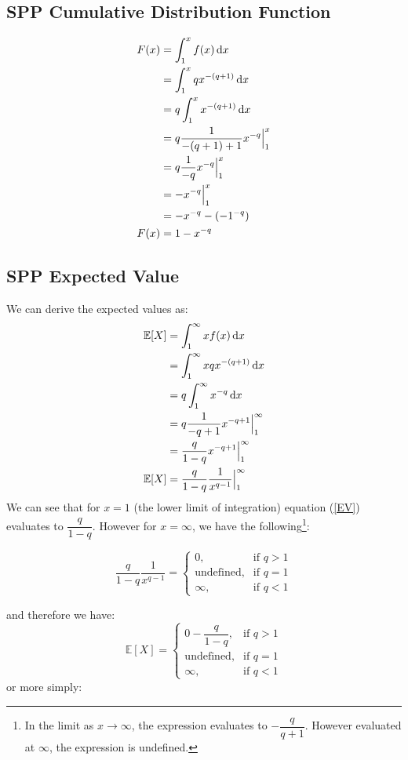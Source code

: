 \documentclass[]{article} %
\begin{document}
\subsection{SPP Cumulative Distribution Function}\label{ParetoF}
\begin{align}
	F(x) &= \int_{1}^{x} f(x) \operatorname{d \!} x \nonumber\\
		&= \int_{1}^{x}qx^{-(q+1)} \operatorname{d \!} x\nonumber\\
		&= q \int_{1}^{x}x^{-(q+1)} \operatorname{d \!} x\nonumber\\
		&= q \frac{1}{-(q+1)+1} x^{-q} \Big|_{1}^{x}\nonumber\\
		&=  q \frac{1}{-q} x^{-q} \Big|_{1}^{x}\nonumber\\
		&=  - x^{-q}\Big|_{1}^{x}\nonumber\\
		&= -x^{-q} - (-1^{-q})\nonumber\\
	 F(x) &=  1 - x^{-q}
\end{align}
\subsection{SPP Expected Value}\label{derive:ParetoEV}
We can derive the expected values as:
\begin{align}
\mathbb{E}[X] & = \int_{1}^{\infty}x f(x) \operatorname{d \!} x \nonumber\\
& = \int_{1}^{\infty}xqx^{-(q+1)} \operatorname{d \!} x\nonumber\\
& = q \int_{1}^{\infty}x^{-q} \operatorname{d \!} x\nonumber\\
& = q \frac{1}{-q+1} x^{-q+1} \Big|_{1}^{\infty}\nonumber\\
& = \frac{q}{1-q} x^{-q+1} \Big|_{1}^{\infty}\nonumber\\
\mathbb{E}[X] 	& = \frac{q}{1-q} \dfrac{1}{x^{q-1}} \Big|_{1}^{\infty}\label{EV}
\end{align}
We can see that for $x = 1$ (the lower limit of integration) equation (\ref{EV}) evaluates to $\dfrac{q}{1-q}$. However for $x = \infty$, we have the following\footnote{In the limit as $x\to\infty$, the expression evaluates to  $-\dfrac{q}{q+1}$. However evaluated at $\infty$, the expression is undefined.}:

\[
\frac{q}{1-q} \dfrac{1}{x^{q-1}} = 
\begin{cases}
0,& \text{if } q > 1\\
\text{undefined},& \text{if } q = 1\\         
\infty, & \text{if }q < 1
\end{cases}
\]

and therefore we have: 
\[
\mathbb{E}[X]  = 
\begin{cases}
0 - \dfrac{q}{1-q},& \text{if } q > 1\\
\text{undefined},& \text{if } q = 1\\         
\infty, & \text{if }q < 1
\end{cases}
\]
or more simply:
\end{document}
